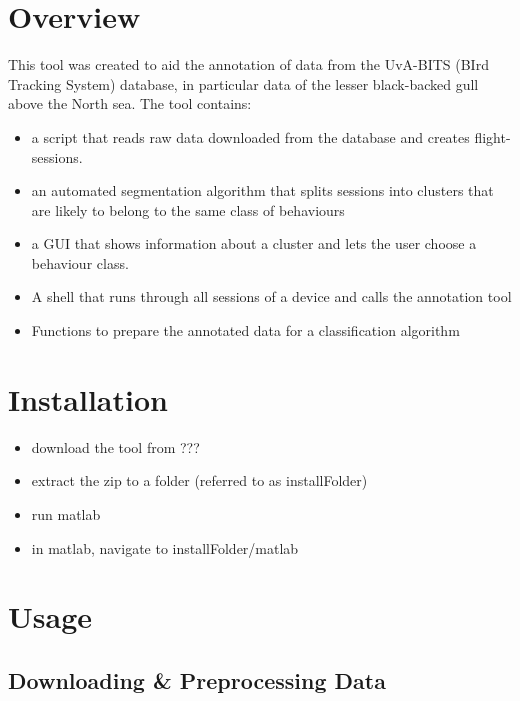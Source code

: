 \documentclass[a4paper, 11pt]{article}
\begin{document}

\vspace*{00mm}
\tableofcontents
\newpage

\section{Overview}

This tool was created to aid the annotation of data from the UvA-BITS (BIrd Tracking System) database, in particular data of the lesser black-backed gull above the North sea. The tool contains:
\begin{itemize}
\item
a script that reads raw data downloaded from the database and creates flight-sessions.
\item
an automated segmentation algorithm that splits sessions into clusters that are likely to belong to the same class of behaviours 
\item
a GUI that shows information about a cluster and lets the user choose a behaviour class.
\item
A shell that runs through all sessions of a device and calls the annotation tool
\item
Functions to prepare the annotated data for a classification algorithm
\end{itemize}

\section{Installation}
\begin{itemize}
	\item
	download the tool from ???
	\item
	extract the zip to a folder (referred to as installFolder)
	\item
	run matlab
	\item
	in matlab, navigate to installFolder/matlab
\end{itemize}
\section{Usage}
\subsection{Downloading \& Preprocessing Data}

 
\end{document}
